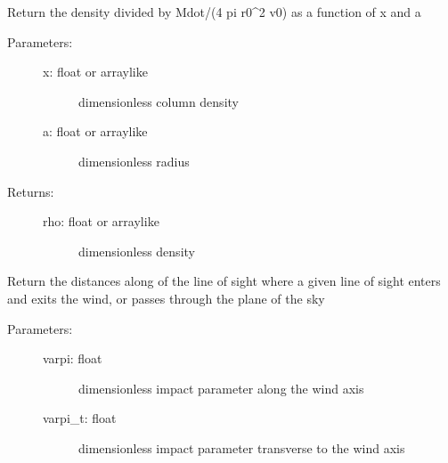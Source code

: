 \documentclass[letterpaper,10pt,english]{sphinxmanual}
\begin{document}
\begin{fulllineitems}
\begin{fulllineitems}
\begin{description}
\end{description}

\end{fulllineitems}


\begin{fulllineitems}
\label{fulldoc:despotic.winds.pwind.rho}
Return the density divided by Mdot/(4 pi r0\textasciicircum{}2 v0) as a
function of x and a
\begin{description}
\item[{Parameters:}] \leavevmode\begin{description}
\item[{x: float or arraylike}] \leavevmode
dimensionless column density

\item[{a: float or arraylike}] \leavevmode
dimensionless radius

\end{description}

\item[{Returns:}] \leavevmode\begin{description}
\item[{rho: float or arraylike}] \leavevmode
dimensionless density

\end{description}

\end{description}

\end{fulllineitems}


\begin{fulllineitems}
\label{fulldoc:despotic.winds.pwind.s_crit}
Return the distances along of the line of sight where a given
line of sight enters and exits the wind, or passes
through the plane of the sky
\begin{description}
\item[{Parameters:}] \leavevmode\begin{description}
\item[{varpi: float}] \leavevmode
dimensionless impact parameter along the wind axis

\item[{varpi\_t: float}] \leavevmode
dimensionless impact parameter transverse to the wind axis


\end{description}
\end{description}
\end{fulllineitems}
\end{fulllineitems}
\end{document}

